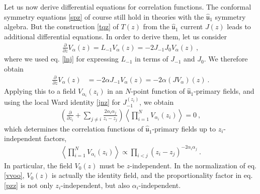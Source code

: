 \documentclass[12pt,a4paper,notitlepage]{report}
\numberwithin{equation}{section}
\theoremstyle{break}
\begin{document}
Let us now derive differential equations for correlation functions.
The conformal symmetry equations \eqref{spz} of course still hold in theories with the $\hat{\mathfrak{u}}_1$ symmetry algebra.
But the construction \eqref{tqz} of $T(z)$ from the $\hat{\mathfrak{u}}_1$ current $J(z)$ leads to additional differential equations.
In order to derive them, let us consider 
\begin{align}
 {\frac{\partial}{\partial z}} V_{\alpha}(z) = L_{-1}V_\alpha(z) = -2J_{-1}J_0 V_\alpha(z)\ ,
\end{align}
where we used eq. \eqref{lnj} for expressing $L_{-1}$ in terms of $J_{-1}$ and $J_0$.
We therefore obtain
\begin{align}
{\frac{\partial}{\partial z}} V_{\alpha}(z)&= -2\alpha J_{-1}V_\alpha(z) = -2\alpha(JV_\alpha)(z)\ .
\label{pvaj}
\end{align}
Applying this to a field $V_{\alpha_i}(z_i)$ in an 
$N$-point function of $\hat{\mathfrak{u}}_1$-primary fields, and using 
the local Ward identity \eqref{jnz} for $J_{-1}^{(z_i)}$, we obtain 
\begin{align}
\left( {\frac{\partial}{\partial z_i}} +\sum_{j\neq i} \frac{2\alpha_i\alpha_j}{z_i-z_j} \right) \left\langle \prod_{i=1}^N V_{\alpha_i}(z_i) \right\rangle = 0 \ ,
\label{kzl}
\end{align}
which determines the correlation functions of $\hat{\mathfrak{u}}_1$-primary fields up to $z_i$-independent factors, 
\begin{align}
 \boxed{\left\langle \prod_{i=1}^N V_{\alpha_i}(z_i)\right\rangle  \propto \prod_{i<j} (z_i-z_j)^{-2\alpha_i\alpha_j}}\ .
\label{pzz}
\end{align}
In particular, the field $V_0(z)$ must be $z$-independent.
In the normalization of eq. \eqref{vvoo}, $V_0(z)$ is actually the identity field, and the proportionality factor in eq. \eqref{pzz} is not only $z_i$-independent, but also $\alpha_i$-independent.
\end{document}
